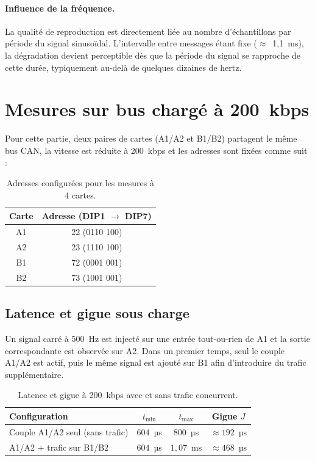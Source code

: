 \paragraph{Influence de la fréquence.}
La qualité de reproduction est directement liée au nombre d'échantillons
par période du signal sinusoïdal. L'intervalle entre messages étant fixe
($\approx$~1,1~ms), la dégradation devient perceptible dès que la période du
signal se rapproche de cette durée, typiquement au-delà de quelques dizaines
de hertz.

\newpage
\section{Mesures sur bus chargé à 200~kbps}
\label{section5}
Pour cette partie, deux paires de cartes (A1/A2 et B1/B2) partagent le même
bus CAN, la vitesse est réduite à \num{200}~kbps et les adresses sont fixées
comme suit :

\begin{table}[H]
\centering
\begin{tabular}{|c|c|}
\hline
Carte & Adresse (DIP1 $\rightarrow$ DIP7) \\
\hline
A1 & 22 (0110 100) \\
A2 & 23 (1110 100) \\
B1 & 72 (0001 001) \\
B2 & 73 (1001 001) \\
\hline
\end{tabular}
\caption{Adresses configurées pour les mesures à 4 cartes.}
\end{table}

\subsection{Latence et gigue sous charge}

Un signal carré à \num{500}~Hz est injecté sur une entrée tout-ou-rien de A1
et la sortie correspondante est observée sur A2. Dans un premier temps, seul
le couple A1/A2 est actif, puis le même signal est ajouté sur B1 afin
d'introduire du trafic supplémentaire.

\begin{table}[H]
\centering
\begin{tabular}{|l|c|c|c|}
\hline
Configuration & $t_{\min}$ & $t_{\max}$ & Gigue $J$ \\
\hline
Couple A1/A2 seul (sans trafic) & $604$~µs & $800$~µs & $\approx 192$~µs \\
\hline
A1/A2 + trafic sur B1/B2        & $604$~µs & $1{,}07$~ms & $\approx 468$~µs \\
\hline
\end{tabular}
\caption{Latence et gigue à \num{200}~kbps avec et sans trafic concurrent.}
\label{tab:latence_charge}
\end{table}

